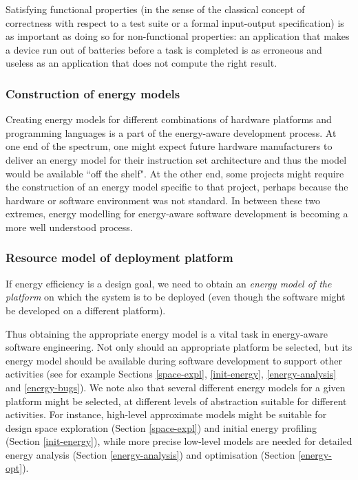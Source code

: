 \documentclass[oneside]{book}
\begin{document}
Satisfying
functional properties (in the sense of the classical concept of
correctness with respect to a test suite or a formal input-output
specification) is as important as doing so for non-functional
properties: an application that makes a device run out of batteries
before a task is completed is as erroneous and useless as an
application that does not compute the right result. 

\subsubsection{Construction of energy models}\label{energy-models}

Creating energy models for different combinations of hardware platforms and programming 
languages is a part of the energy-aware development process.  At one end of the 
spectrum,  one might
expect future hardware manufacturers to deliver an energy model for their instruction set architecture 
and thus the model would be available ``off the shelf".  At the other end, some
projects might require the construction of an energy model specific to that project, perhaps
because the hardware or software environment was not standard.  In between these two
extremes, energy modelling  for energy-aware software development is becoming a more
well understood process.

\subsubsection{Resource model of deployment platform}\label{platform-model}

If energy efficiency is a design goal, we need to obtain an \emph{energy model
of the platform} on which the system is to be deployed (even though the
software might be developed on a different platform).

Thus obtaining the appropriate energy model is a vital task in energy-aware 
software engineering.  Not only should an appropriate platform be selected, but
its energy model should be available during software development to support other 
activities (see for example Sections \ref{space-expl}, \ref{init-energy}, \ref{energy-analysis} and \ref{energy-bugs}).
We note also that several different energy models for a given platform might be
selected, at different levels of abstraction suitable for different activities.  For instance,
high-level approximate models might be suitable for design space exploration (Section \ref{space-expl}) and initial energy profiling (Section \ref{init-energy}), while more precise low-level models are needed for detailed energy analysis (Section \ref{energy-analysis}) and optimisation 
(Section \ref{energy-opt}).
\end{document}
